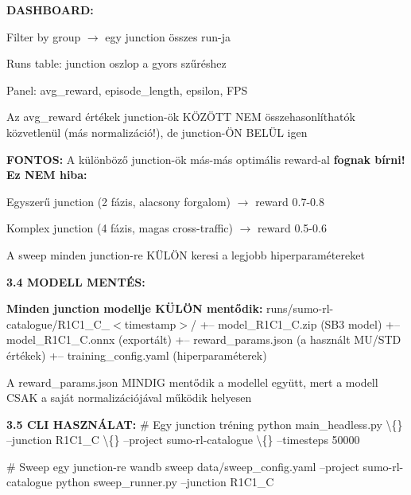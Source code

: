 \documentclass[11pt,a4paper]{article}
\begin{document}
\textbf{DASHBOARD:}
\par\noindent\hspace*{1em}\textbullet{} Filter by group $\rightarrow$ egy junction összes run-ja
\par\noindent\hspace*{1em}\textbullet{} Runs table: junction oszlop a gyors szűréshez
\par\noindent\hspace*{1em}\textbullet{} Panel: avg\_reward, episode\_length, epsilon, FPS
\par\noindent\hspace*{1em}\textbullet{} Az avg\_reward értékek junction-ök KÖZÖTT NEM összehasonlíthatók
közvetlenül (más normalizáció!), de junction-ÖN BELÜL igen

\textbf{FONTOS:} A különböző junction-ök más-más optimális reward-al
\textbf{fognak bírni! Ez NEM hiba:}
\par\noindent\hspace*{1em}\textbullet{} Egyszerű junction (2 fázis, alacsony forgalom) $\rightarrow$ reward 0.7-0.8
\par\noindent\hspace*{1em}\textbullet{} Komplex junction (4 fázis, magas cross-traffic) $\rightarrow$ reward 0.5-0.6
\par\noindent\hspace*{1em}\textbullet{} A sweep minden junction-re KÜLÖN keresi a legjobb hiperparamétereket

\textbf{3.4 MODELL MENTÉS:}
\par\noindent\hspace*{1em}\textbullet{} \textbf{Minden junction modellje KÜLÖN mentődik:}
runs/sumo-rl-catalogue/R1C1\_C\_$<$timestamp$>$/
+-- model\_R1C1\_C.zip (SB3 model)
+-- model\_R1C1\_C.onnx (exportált)
+-- reward\_params.json (a használt MU/STD értékek)
+-- training\_config.yaml (hiperparaméterek)
\par\noindent\hspace*{1em}\textbullet{} A reward\_params.json MINDIG mentődik a modellel együtt,
mert a modell CSAK a saját normalizációjával működik helyesen

\textbf{3.5 CLI HASZNÁLAT:}
\# Egy junction tréning
python main\_headless.py \textbackslash\{\}
--junction R1C1\_C \textbackslash\{\}
--project sumo-rl-catalogue \textbackslash\{\}
--timesteps 50000

\# Sweep egy junction-re
wandb sweep data/sweep\_config.yaml --project sumo-rl-catalogue
python sweep\_runner.py --junction R1C1\_C
\end{document}
